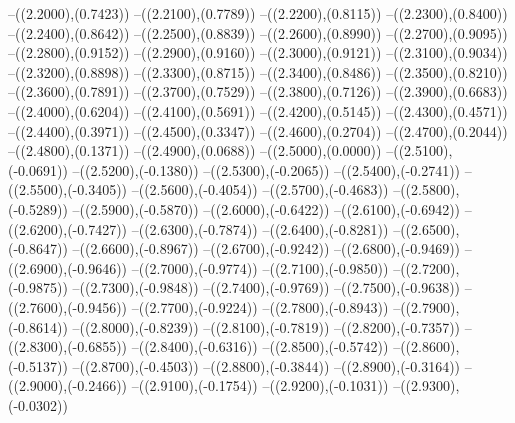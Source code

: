 {	--({\sx*(2.2000)},{\sy*(0.7423)})
	--({\sx*(2.2100)},{\sy*(0.7789)})
	--({\sx*(2.2200)},{\sy*(0.8115)})
	--({\sx*(2.2300)},{\sy*(0.8400)})
	--({\sx*(2.2400)},{\sy*(0.8642)})
	--({\sx*(2.2500)},{\sy*(0.8839)})
	--({\sx*(2.2600)},{\sy*(0.8990)})
	--({\sx*(2.2700)},{\sy*(0.9095)})
	--({\sx*(2.2800)},{\sy*(0.9152)})
	--({\sx*(2.2900)},{\sy*(0.9160)})
	--({\sx*(2.3000)},{\sy*(0.9121)})
	--({\sx*(2.3100)},{\sy*(0.9034)})
	--({\sx*(2.3200)},{\sy*(0.8898)})
	--({\sx*(2.3300)},{\sy*(0.8715)})
	--({\sx*(2.3400)},{\sy*(0.8486)})
	--({\sx*(2.3500)},{\sy*(0.8210)})
	--({\sx*(2.3600)},{\sy*(0.7891)})
	--({\sx*(2.3700)},{\sy*(0.7529)})
	--({\sx*(2.3800)},{\sy*(0.7126)})
	--({\sx*(2.3900)},{\sy*(0.6683)})
	--({\sx*(2.4000)},{\sy*(0.6204)})
	--({\sx*(2.4100)},{\sy*(0.5691)})
	--({\sx*(2.4200)},{\sy*(0.5145)})
	--({\sx*(2.4300)},{\sy*(0.4571)})
	--({\sx*(2.4400)},{\sy*(0.3971)})
	--({\sx*(2.4500)},{\sy*(0.3347)})
	--({\sx*(2.4600)},{\sy*(0.2704)})
	--({\sx*(2.4700)},{\sy*(0.2044)})
	--({\sx*(2.4800)},{\sy*(0.1371)})
	--({\sx*(2.4900)},{\sy*(0.0688)})
	--({\sx*(2.5000)},{\sy*(0.0000)})
	--({\sx*(2.5100)},{\sy*(-0.0691)})
	--({\sx*(2.5200)},{\sy*(-0.1380)})
	--({\sx*(2.5300)},{\sy*(-0.2065)})
	--({\sx*(2.5400)},{\sy*(-0.2741)})
	--({\sx*(2.5500)},{\sy*(-0.3405)})
	--({\sx*(2.5600)},{\sy*(-0.4054)})
	--({\sx*(2.5700)},{\sy*(-0.4683)})
	--({\sx*(2.5800)},{\sy*(-0.5289)})
	--({\sx*(2.5900)},{\sy*(-0.5870)})
	--({\sx*(2.6000)},{\sy*(-0.6422)})
	--({\sx*(2.6100)},{\sy*(-0.6942)})
	--({\sx*(2.6200)},{\sy*(-0.7427)})
	--({\sx*(2.6300)},{\sy*(-0.7874)})
	--({\sx*(2.6400)},{\sy*(-0.8281)})
	--({\sx*(2.6500)},{\sy*(-0.8647)})
	--({\sx*(2.6600)},{\sy*(-0.8967)})
	--({\sx*(2.6700)},{\sy*(-0.9242)})
	--({\sx*(2.6800)},{\sy*(-0.9469)})
	--({\sx*(2.6900)},{\sy*(-0.9646)})
	--({\sx*(2.7000)},{\sy*(-0.9774)})
	--({\sx*(2.7100)},{\sy*(-0.9850)})
	--({\sx*(2.7200)},{\sy*(-0.9875)})
	--({\sx*(2.7300)},{\sy*(-0.9848)})
	--({\sx*(2.7400)},{\sy*(-0.9769)})
	--({\sx*(2.7500)},{\sy*(-0.9638)})
	--({\sx*(2.7600)},{\sy*(-0.9456)})
	--({\sx*(2.7700)},{\sy*(-0.9224)})
	--({\sx*(2.7800)},{\sy*(-0.8943)})
	--({\sx*(2.7900)},{\sy*(-0.8614)})
	--({\sx*(2.8000)},{\sy*(-0.8239)})
	--({\sx*(2.8100)},{\sy*(-0.7819)})
	--({\sx*(2.8200)},{\sy*(-0.7357)})
	--({\sx*(2.8300)},{\sy*(-0.6855)})
	--({\sx*(2.8400)},{\sy*(-0.6316)})
	--({\sx*(2.8500)},{\sy*(-0.5742)})
	--({\sx*(2.8600)},{\sy*(-0.5137)})
	--({\sx*(2.8700)},{\sy*(-0.4503)})
	--({\sx*(2.8800)},{\sy*(-0.3844)})
	--({\sx*(2.8900)},{\sy*(-0.3164)})
	--({\sx*(2.9000)},{\sy*(-0.2466)})
	--({\sx*(2.9100)},{\sy*(-0.1754)})
	--({\sx*(2.9200)},{\sy*(-0.1031)})
	--({\sx*(2.9300)},{\sy*(-0.0302)})
}
